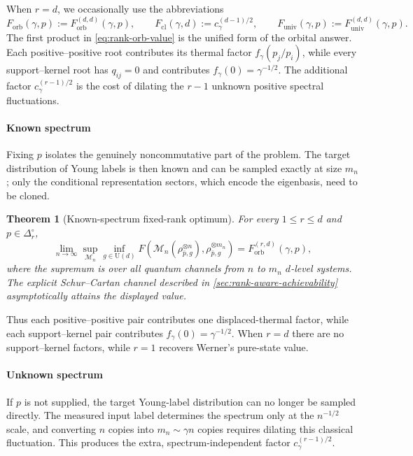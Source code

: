\documentclass[11pt]{article}
\newtheorem{theorem}{Theorem}[section]
\theoremstyle{remark}
\theoremstyle{plain}
\newcommand{\cM}{\mathcal M}
\newcommand{\U}{\mathrm U}
\newcommand{\ot}{\otimes}
\newcommand{\Forb}{F_{\mathrm{orb}}}
\newcommand{\Fcl}{F_{\mathrm{cl}}}
\newcommand{\Funiv}{F_{\mathrm{univ}}}
\begin{document}
When \(r=d\), we occasionally use the abbreviations
\begin{equation}\label{eq:main-values}
  \Forb(\gamma,p):=\Forb^{(d,d)}(\gamma,p),\qquad
  \Fcl(\gamma,d):=c_\gamma^{(d-1)/2},\qquad
  \Funiv(\gamma,p):=\Funiv^{(d,d)}(\gamma,p).
\end{equation}
The first product in \eqref{eq:rank-orb-value} is the unified form of the
orbital answer.  Each positive--positive root contributes its thermal factor
\(f_\gamma(p_j/p_i)\), while every support--kernel root has \(q_{ij}=0\)
and contributes \(f_\gamma(0)=\gamma^{-1/2}\).  The additional factor
\(c_\gamma^{(r-1)/2}\) is the cost of dilating the \(r-1\) unknown positive
spectral fluctuations.

\paragraph{Known spectrum}
Fixing \(p\) isolates the genuinely noncommutative part of the problem.  The
target distribution of Young labels is then known and can be sampled exactly
at size \(m_n\); only the conditional representation sectors, which encode
the eigenbasis, need to be cloned.

\begin{theorem}[Known-spectrum fixed-rank optimum]\label{thm:known-optimum}
For every \(1\le r\le d\) and \(p\in\Delta_r^\circ\),
\begin{equation}\label{eq:known-optimum}
  \lim_{n\to\infty}
  \sup_{\cM_n}\inf_{g\in\U(d)}
  F\!\left(\cM_n(\rho_{\bar p,g}^{\ot n}),
             \rho_{\bar p,g}^{\ot m_n}\right)
  =\Forb^{(r,d)}(\gamma,p),
\end{equation}
where the supremum is over all quantum channels from \(n\) to \(m_n\)
\(d\)-level systems.  The explicit Schur--Cartan channel described in
\cref{sec:rank-aware-achievability} asymptotically
attains the displayed value.
\end{theorem}

Thus each positive--positive pair contributes one displaced-thermal factor,
while each support--kernel pair contributes
\(f_\gamma(0)=\gamma^{-1/2}\).  When \(r=d\) there are no
support--kernel factors, while \(r=1\) recovers Werner's pure-state value.

\paragraph{Unknown spectrum}
If \(p\) is not supplied, the target Young-label distribution can no longer
be sampled directly.  The measured input label determines the spectrum only
at the \(n^{-1/2}\) scale, and converting \(n\) copies into
\(m_n\sim\gamma n\) copies requires dilating this classical fluctuation.
This produces the extra, spectrum-independent factor
\(c_\gamma^{(r-1)/2}\).
\end{document}

